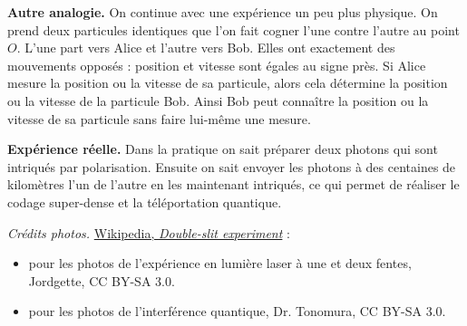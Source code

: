 \documentclass[11pt,class=report,crop=false]{standalone}
\begin{document}
\bigskip 
\textbf{Autre analogie.} On continue avec une expérience un peu plus physique.
On prend deux particules identiques que l'on fait cogner l'une contre l'autre au point $O$.
L'une part vers Alice et l'autre vers Bob. Elles ont exactement des mouvements opposés : position et vitesse sont égales au signe près. Si Alice mesure la position ou la vitesse de sa particule, alors cela détermine la position ou la vitesse de la particule Bob. Ainsi Bob peut connaître la position ou la vitesse de sa particule sans faire lui-même une mesure.


\bigskip
\textbf{Expérience réelle.} Dans la pratique on sait préparer deux photons qui sont intriqués par polarisation. Ensuite on sait envoyer les photons à des centaines de kilomètres l'un de l'autre en les maintenant intriqués, ce qui permet de réaliser le codage super-dense et la téléportation quantique.

\bigskip
\bigskip

\emph{Crédits photos.} \href{https://en.wikipedia.org/wiki/Double-slit_experiment}{Wikipedia, \emph{Double-slit experiment}} :
\begin{itemize}
  \item pour les photos de l'expérience en lumière laser à une et deux fentes, Jordgette, CC BY-SA 3.0.
  \item pour les photos de l'interférence quantique, Dr. Tonomura, CC BY-SA 3.0.
\end{itemize}
\end{document}
